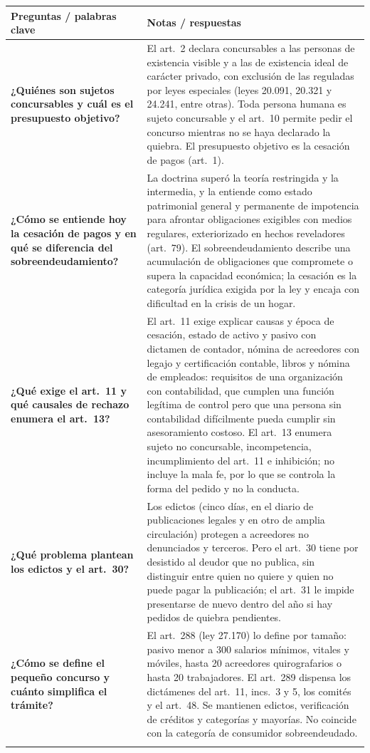 \documentclass[12pt,oneside]{book}
\makeatletter
\newenvironment{cornell}{%
  \renewcommand{\arraystretch}{1.2}%
  \begin{longtable}{@{}>{\raggedright\arraybackslash}p{0.27\textwidth}|>{\raggedright\arraybackslash}p{0.65\textwidth}@{}}
  \toprule
  \textbf{Preguntas / palabras clave} & \textbf{Notas / respuestas} \\
  \midrule
  \endhead
}{%
  \bottomrule
  \end{longtable}%
}
\makeatother
\begin{document}
\begin{cornell}
\textbf{¿Quiénes son sujetos concursables y cuál es el presupuesto objetivo?} &
El art.~2 declara concursables a las personas de existencia visible y a las de existencia ideal de carácter privado, con exclusión de las reguladas por leyes especiales (leyes 20.091, 20.321 y 24.241, entre otras). Toda persona humana es sujeto concursable y el art.~10 permite pedir el concurso mientras no se haya declarado la quiebra. El presupuesto objetivo es la cesación de pagos (art.~1). \\
\addlinespace

\textbf{¿Cómo se entiende hoy la cesación de pagos y en qué se diferencia del sobreendeudamiento?} &
La doctrina superó la teoría restringida y la intermedia, y la entiende como estado patrimonial general y permanente de impotencia para afrontar obligaciones exigibles con medios regulares, exteriorizado en hechos reveladores (art.~79). El sobreendeudamiento describe una acumulación de obligaciones que compromete o supera la capacidad económica; la cesación es la categoría jurídica exigida por la ley y encaja con dificultad en la crisis de un hogar. \\
\addlinespace

\textbf{¿Qué exige el art.~11 y qué causales de rechazo enumera el art.~13?} &
El art.~11 exige explicar causas y época de cesación, estado de activo y pasivo con dictamen de contador, nómina de acreedores con legajo y certificación contable, libros y nómina de empleados: requisitos de una organización con contabilidad, que cumplen una función legítima de control pero que una persona sin contabilidad difícilmente pueda cumplir sin asesoramiento costoso. El art.~13 enumera sujeto no concursable, incompetencia, incumplimiento del art.~11 e inhibición; no incluye la mala fe, por lo que se controla la forma del pedido y no la conducta. \\
\addlinespace

\textbf{¿Qué problema plantean los edictos y el art.~30?} &
Los edictos (cinco días, en el diario de publicaciones legales y en otro de amplia circulación) protegen a acreedores no denunciados y terceros. Pero el art.~30 tiene por desistido al deudor que no publica, sin distinguir entre quien no quiere y quien no puede pagar la publicación; el art.~31 le impide presentarse de nuevo dentro del año si hay pedidos de quiebra pendientes. \\
\addlinespace

\textbf{¿Cómo se define el pequeño concurso y cuánto simplifica el trámite?} &
El art.~288 (ley 27.170) lo define por tamaño: pasivo menor a 300 salarios mínimos, vitales y móviles, hasta 20 acreedores quirografarios o hasta 20 trabajadores. El art.~289 dispensa los dictámenes del art.~11, incs.~3 y 5, los comités y el art.~48. Se mantienen edictos, verificación de créditos y categorías y mayorías. No coincide con la categoría de consumidor sobreendeudado. \\
\addlinespace


\end{cornell}
\end{document}
